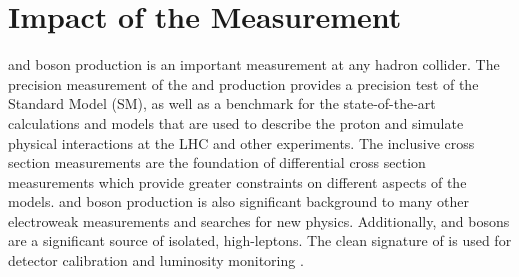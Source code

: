 \section{Impact of the Measurement}
\W and \Z boson production is an important measurement at any hadron collider. The precision measurement of the \W and \Z  production provides a precision test of the Standard Model (SM), as well as a benchmark for the state-of-the-art calculations and models that are used to describe the proton and simulate physical interactions at the LHC and other experiments. The inclusive cross section measurements are the foundation of differential cross section measurements which provide greater constraints on different aspects of the models.  \W and \Z boson production is also significant background to many other electroweak measurements and searches for new physics.
Additionally, \W and \Z bosons are a significant source of isolated, high-\pt leptons. The clean signature of \zll is used for detector calibration and luminosity monitoring \cite{xinmei}.
